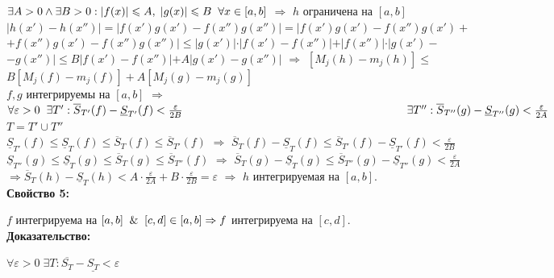 \documentclass[a4paper,12pt]{article} %
\renewcommand {\leq}{\leqslant}
\begin{document}
$ \exists A > 0 \wedge  \exists B > 0: |f(x)| \leq A, \hspace*{1mm} |g(x)| \leq B \hspace*{2mm} \forall x \in [a, b]$ $\Rightarrow$ $ h $ ограничена на $ [a, b]$ \\ [2 mm]
$| h(x') - h(x'') | = | f(x')g(x') - f(x'')g(x'')| = |f(x')g(x') - f(x'')g(x') + $ \\ [2 mm] $+ f(x'')g(x') - f(x'')g(x'') | \leq |g(x')| \cdot |f(x') - f(x'')| + |f(x'')| \cdot | g(x') - $ \\ [2 mm] $ - g(x'') | \leq B|f(x') - f(x'')| + A|g(x') - g(x'')| $ $\Rightarrow$  $[ M_j(h) - m_j(h)] \leq $ \\ [2mm] $  B[M_j(f) - m_j(f)] + A[M_j(g) - m_j(g)] $ \\ [3 mm]
$ f, g $ интегрируемы на $ [a, b] $ $ \Rightarrow $ $ \forall \varepsilon > 0 \hspace*{2mm} \exists T' : \overline{S}_{T'}(f) - \underline{S}_{T'} (f) < \frac {\varepsilon}{2B} \\ [2 mm] \hspace*{70mm} \exists T'' : \overline{S}_{T''}(g) - \underline{S}_{T''} (g) < \frac {\varepsilon}{2A} $ \\ [3 mm]
$ T = T' \cup T''$ \\ [2 mm]
$ \underline{S}_{T'}(f) \leq \underline{S}_{T}(f) \leq \overline{S}_{T}(f) \leq \overline{S}_{T'}(f) $ $ \Rightarrow $ $\overline{S}_{T}(f) - \underline{S}_{T} (f)  \leq \overline{S}_{T'}(f) - \underline{S}_{T'} (f) < \frac {\varepsilon}{2B} $ \\ [2 mm]
$ \underline{S}_{T''}(g) \leq \underline{S}_{T}(g) \leq \overline{S}_{T}(g) \leq \overline{S}_{T''}(f) $ $ \Rightarrow $ $\overline{S}_{T}(g) - \underline{S}_{T} (g)  \leq \overline{S}_{T''}(g) - \underline{S}_{T''} (g) < \frac {\varepsilon}{2A} $ \\

$\Rightarrow  \overline{S}_{T}(h) - \underline{S}_{T} (h) < A \cdot \frac {\varepsilon}{2A} + B \cdot \frac{\varepsilon}{2B} = \varepsilon$ $\Rightarrow$ $ h $ интегрируемая на $ [a, b] $.\\

\textbf{Свойство 5:}

$f$ интегрируема на $[a,b] \And [c,d] \in [a,b]\Rightarrow f$ интегрируема на $[c,d]$.\\

\textbf{Доказательство:}

$\forall \varepsilon > 0 \; \exists T: \overline{S_T}- \underline{S_T}< \varepsilon$
\end{document}
